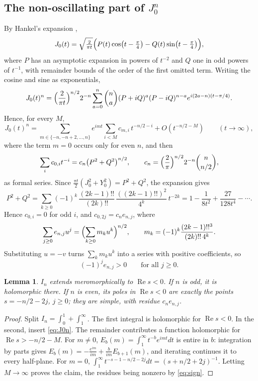 \documentclass[11pt]{amsart}
\newtheorem{lemma}[thm]{Lemma}
\theoremstyle{definition}
\begin{document}
\subsection{The non-oscillating part of \texorpdfstring{$J_0^n$}{J0 to the n}}
By Hankel's expansion \cite[\S10.17]{DLMF},
\[
J_0(t)=\sqrt{\tfrac2{\pi t}}\Bigl(P(t)\cos\bigl(t-\tfrac\pi4\bigr)-Q(t)\sin\bigl(t-\tfrac\pi4\bigr)\Bigr),
\]
where $P$ has an asymptotic expansion in powers of $t^{-2}$ and $Q$ one in odd powers of $t^{-1}$, with remainder bounds of the order of the first omitted term. Writing the cosine and sine as exponentials,
\[
J_0(t)^n=\Bigl(\frac2{\pi t}\Bigr)^{n/2}2^{-n}\sum_{a=0}^n\binom na(P+iQ)^a(P-iQ)^{n-a}e^{i(2a-n)(t-\pi/4)}.
\]
Hence, for every $M$,
\begin{equation}\label{eq:J0n}
J_0(t)^n=\sum_{m\in\{-n,-n+2,\dots,n\}}e^{imt}\sum_{i<M}c_{m,i}\,t^{-n/2-i}+O(t^{-n/2-M})\qquad(t\to\infty),
\end{equation}
where the term $m=0$ occurs only for even $n$, and then
\begin{equation}\label{eq:nonosc}
\sum_ic_{0,i}t^{-i}=c_n\bigl(P^2+Q^2\bigr)^{n/2},\qquad c_n=\Bigl(\frac2\pi\Bigr)^{n/2}2^{-n}\binom n{n/2},
\end{equation}
as formal series. Since $\frac{\pi t}2(J_0^2+Y_0^2)=P^2+Q^2$, the expansion \cite[10.18.17]{DLMF} gives
\[
P^2+Q^2=\sum_{k\ge0}(-1)^k\,\frac{(2k-1)!!}{(2k)!!}\,\frac{((2k-1)!!)^2}{4^k}\,t^{-2k}=1-\frac1{8t^2}+\frac{27}{128t^4}-\cdots.
\]
Hence $c_{0,i}=0$ for odd $i$, and $c_{0,2j}=c_ne_{n,j}$, where
\[
\sum_{j\ge0}e_{n,j}u^j=\Bigl(\sum_{k\ge0}m_ku^k\Bigr)^{n/2},\qquad m_k=(-1)^k\frac{(2k-1)!!^3}{(2k)!!\,4^k}.
\] Substituting $u=-v$ turns $\sum_km_ku^k$ into a series with positive coefficients, so
\begin{equation}\label{eq:sign}
(-1)^je_{n,j}>0\qquad\text{for all }j\ge0.
\end{equation}

\begin{lemma}\label{lem:In}
$I_n$ extends meromorphically to $\operatorname{Re}s<0$. If $n$ is odd, it is holomorphic there. If $n$ is even, its poles in $\operatorname{Re}s<0$ are exactly the points $s=-n/2-2j$, $j\ge0$; they are simple, with residue $c_ne_{n,j}$.
\end{lemma}

\begin{proof}
Split $I_n=\int_0^1+\int_1^\infty$. The first integral is holomorphic for $\operatorname{Re}s<0$. In the second, insert \eqref{eq:J0n}. The remainder contributes a function holomorphic for $\operatorname{Re}s>-n/2-M$. For $m\ne0$, $E_b(m)=\int_1^\infty t^{-b}e^{imt}dt$ is entire in $b$: integration by parts gives $E_b(m)=-\frac{e^{im}}{im}+\frac b{im}E_{b+1}(m)$, and iterating continues it to every half-plane. For $m=0$, $\int_1^\infty t^{-s-1-n/2-2j}dt=(s+n/2+2j)^{-1}$. Letting $M\to\infty$ proves the claim, the residues being nonzero by \eqref{eq:sign}.
\end{proof}
\end{document}
